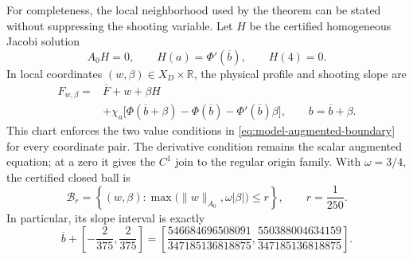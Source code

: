 For completeness, the local neighborhood used by the theorem can be stated
without suppressing the shooting variable.  Let \(H\) be the certified
homogeneous Jacobi solution
\[
  A_0H=0,
  \qquad
  H(a)=\Phi'(\overline b),
  \qquad
  H(4)=0.
\]
In local coordinates
\((w,\beta)\in X_D\times\mathbb R\), the physical profile and shooting slope
are
\begin{equation}
  \begin{split}
  F_{w,\beta}
    ={}&\overline F+w+\beta H\\
      &+\chi_a\bigl[\Phi(\overline b+\beta)-\Phi(\overline b)
                    -\Phi'(\overline b)\beta\bigr],
  \qquad
  b=\overline b+\beta .
  \end{split}
  \label{eq:model-chart}
\end{equation}
This chart enforces the two value conditions in
\eqref{eq:model-augmented-boundary} for every coordinate pair.  The derivative
condition remains the scalar augmented equation; at a zero it gives the
\(C^1\) join to the regular origin family.  With \(\omega=3/4\), the certified
closed ball is
\begin{equation}
  \mathcal B_r
  =\left\{(w,\beta):
      \max\bigl(\|w\|_{A_0},\omega|\beta|\bigr)\le r\right\},
  \qquad
  r=\frac1{250}.
  \label{eq:model-ball}
\end{equation}
In particular, its slope interval is exactly
\begin{equation}
  \overline b+\left[-\frac{2}{375},\frac{2}{375}\right]
  =\left[
    \frac{546684696508091}{347185136818875},
    \frac{550388004634159}{347185136818875}
  \right].
  \label{eq:model-slope-interval}
\end{equation}

